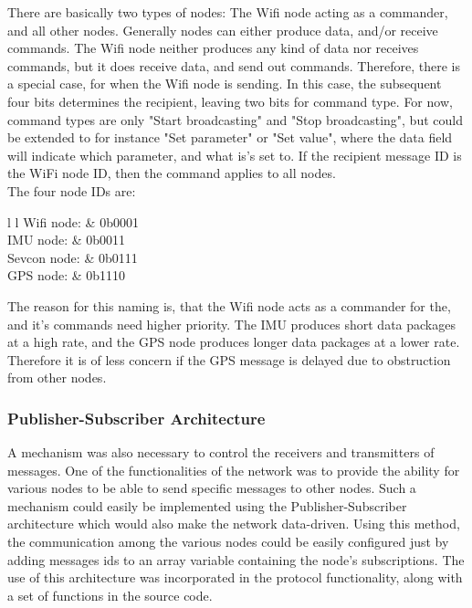 There are basically two types of nodes: The Wifi node acting as a commander, and all other nodes.
Generally nodes can either produce data, and/or receive commands.
The Wifi node neither produces any kind of data nor receives commands, but it does receive data, and send out commands.
Therefore, there is a special case, for when the Wifi node is sending.
In this case, the subsequent four bits determines the recipient, leaving two bits for command type. 
For now, command types are only "Start broadcasting" and "Stop broadcasting", but could be extended to for instance "Set parameter" or "Set value", where the data field will indicate which parameter, and what is's set to.
If the recipient message ID is the WiFi node ID, then the command applies to all nodes.\\

The four node IDs are:
\begin{table}[h!]
	\begin{tabular}{{l} {l}}
		Wifi node: & 0b0001 \\
		IMU node: & 0b0011 \\
		Sevcon node: & 0b0111 \\
		GPS node: & 0b1110
	\end{tabular}
\end{table}
The reason for this naming is, that the Wifi node acts as a commander for the, and it's commands need higher priority.
The IMU produces short data packages at a high rate, and the GPS node produces longer data packages at a lower rate. 
Therefore it is of less concern if the GPS message is delayed due to obstruction from other nodes. 

\subsubsection{Publisher-Subscriber Architecture}
A mechanism was also necessary to control the receivers and transmitters of messages.
One of the functionalities of the network was to provide the ability for various nodes to be able to send specific messages to other nodes.
Such a mechanism could easily be implemented using the Publisher-Subscriber architecture which would also make the network data-driven.
Using this method, the communication among the various nodes could be easily configured just by adding messages ids to an array variable containing the node's subscriptions.
The use of this architecture was incorporated in the protocol functionality, along with a set of functions in the source code.
